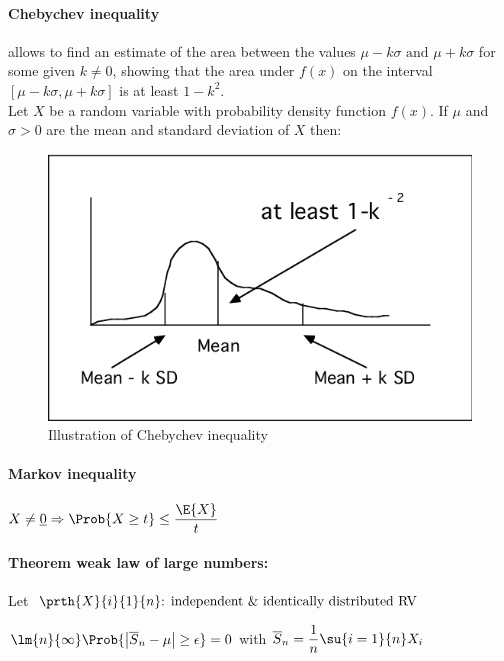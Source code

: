 \paragraph{Chebychev inequality}
allows to find an estimate of the area between the
values $\mu-k\sigma\text{ and }\mu+k\sigma$ for some given $k\neq 0$, showing
that the area under $f(x)$ on the interval $\left[\mu-k\sigma, \mu+k\sigma
\right]$ is at least $1-k^{2}$.\\
Let $X$ be a random variable with probability density function $f(x)$. If
$\mu$ and $\sigma>0$ are the mean and standard deviation of $X$ then:
\begin{center}
\end{center}
\begin{figure}[H]
	\begin{center}
		\includegraphics[width=.5\textwidth]{chapters/2_statistics/01_fundamental_probability_concepts/1_images/1_ineqChebyGraph.png}
	\end{center}
	\caption{Illustration of Chebychev inequality}
	\label{fig:fig2.01.1}
\end{figure}



\paragraph{Markov inequality}
\begin{center}
		$X\neq\underline{0}\Rightarrow \Prob{X\geq t}\leq \dfrac{\E{X}}{t}$
\end{center}
\paragraph{Theorem weak law of large numbers:}
Let $\prth{X}{i}{1}{n}\text{: independent \& identically distributed RV}$
\begin{center}
	$\lm{n}{\infty}\Prob{\left|\overline{S}_{n}-\mu\right|\geq\epsilon}=0$ with $\overline{S}_{n}=\dfrac{1}{n}\su{ {i=1}}{n}X_{i}$
\end{center}
